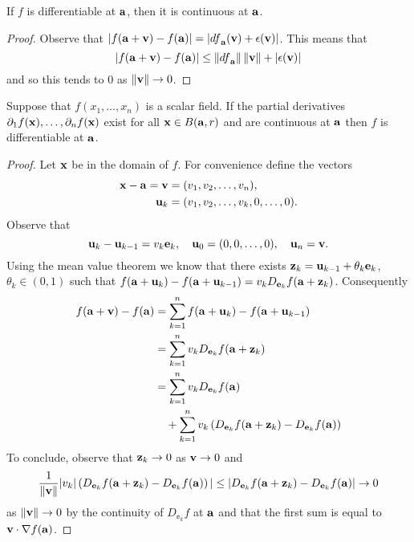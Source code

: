 \begin{theorem*}
    If \(f\) is differentiable at \(\aa\), then it is continuous at \(\aa\).
\end{theorem*}
\begin{proof}
    Observe that \(\abs{f(\aa+\vv)-f(\aa)} = \abs{   {df}_{\aa}(\vv) + \epsilon(\vv)  }\).
    This means that 
    \[
        \abs{f(\aa+\vv)-f(\aa)} \leq \norm{  {df}_{\aa} } \norm{\vv} + \abs{\epsilon(\vv)} 
    \] 
    and so this tends to \(0\) as \(\norm{\vv} \to 0\).
\end{proof}

\begin{theorem}
    Suppose that \(f(x_1,\ldots,x_n)\) is a scalar field.
    If the partial derivatives \(\partial_1 f(\xx), \ldots, \partial_n f(\xx)\) exist for all \(\xx\in B(\aa,r)\) and are continuous at \(\aa\) then \(f\) is differentiable at \(\aa\).
\end{theorem}

\begin{proof}
    Let $\xx$ be in the domain of $f$.
    For convenience define the vectors 
    \[
        \begin{aligned}
            \xx - \aa =\vv &= (v_1,v_2,\ldots,v_n), \\
            \uu_k &= (v_1,v_2,\ldots,v_k,0,\ldots,0).
        \end{aligned}
    \]
    Observe that
    \[
        \uu_k - \uu_{k-1} = v_k \ee_k,
        \quad
        \uu_0 = (0,0,\ldots,0),
        \quad
        \uu_n = \vv.
    \]
    Using the mean value theorem we know that there exists \( \zz_k = \uu_{k-1}+ \theta_k \ee_k\), $\theta_k \in (0,1)$ such that \( f(\aa + \uu_k) - f(\aa + \uu_{k-1}) =  v_k  D_{\ee_k}f(\aa +  \zz_k) \).
    Consequently
    \[
        \begin{aligned}
            f(\aa+\vv) - f(\aa)
             & = \sum_{k=1}^{n} f(\aa + \uu_k) - f(\aa + \uu_{k-1})                                               \\
             & = \sum_{k=1}^{n} v_k  D_{\ee_k}f(\aa +  \zz_k)                                                     \\
             & = \sum_{k=1}^{n} v_k  D_{\ee_k}f(\aa)                                                  \\
             & \quad + \sum_{k=1}^{n}  v_k \left(  D_{\ee_k}f(\aa +  \zz_k)-  D_{\ee_k}f(\aa) \right)
        \end{aligned}
    \]
    To conclude, observe that $\zz_k \to 0$ as $\vv \to 0$ and
    \begin{align*}
      \frac1{\norm{\vv}}|v_k |\left(  D_{\ee_k}f(\aa +  \zz_k)-  D_{\ee_k}f(\aa) \right)|
      \le |D_{\ee_k}f(\aa +  \zz_k)-  D_{\ee_k}f(\aa)| \to 0 
    \end{align*}
    as \(\norm{\vv} \to 0\) by the continuity of $D_{\ee_k}f$ at $\aa$ and that the first sum
    is equal to \(\vv \cdot \nabla f(\aa)\).
\end{proof}



